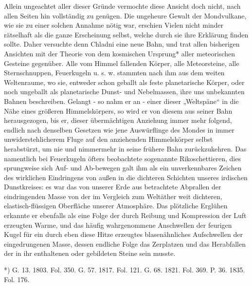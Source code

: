 \documentclass[a4paper, 8pt, oneside, polutonikogreek, german]{article}
\begin{document}
Allein ungeachtet aller dieser Gründe vermochte diese Ansicht doch nicht, nach allen Seiten hin vollständig zu genügen. Die ungeheure Gewalt der Mondvulkane, wie sie zu einer solchen Annahme nötig war, erschien Vielen nicht minder rätselhaft als die ganze Erscheinung selbst, welche durch sie ihre Erklärung finden sollte. Daher versuchte denn Chladni eine neue Bahn, und trat allen bisherigen Ansichten mit der Theorie von dem kosmischen Ursprung* aller meteorischen Gesteine gegenüber. Alle vom Himmel fallenden Körper, alle Meteorsteine, alle Sternschnuppen, Feuerkugeln u. s. w. stammten nach ihm aus dem weiten Weltenraume, wo sie, entweder schon geballt als feste planetarische Körper, oder noch ungeballt als planetarische Dunst- und Nebelmassen, ihre uns unbekannten Bahnen beschreiben. Gelangt - so nahm er an - einer dieser „Weltspäne“ in die Nähe eines größeren Himmelskörpers, so wird er von diesem aus seiner Bahn herausgezogen, bis er, dieser übermächtigen Anziehung immer mehr folgend, endlich nach denselben Gesetzen wie jene Auswürflinge des Mondes in immer unwiderstehlicherem Fluge auf den anziehenden Himmelskörper selbst herabstürzt, um nie und nimmermehr in seine frühere Bahn zurückzukehren. Das namentlich bei Feuerkugeln öfters beobachtete sogenannte Rikoschettieren, dies sprungweise sich Auf- und Ab-bewegen galt ihm als ein unverkennbares Zeichen des wirklichen Eindringens von außen in die dichteren Schichten unseres irdischen Dunstkreises: es war das von unserer Erde aus betrachtete Abprallen der eindringenden Masse von der im Vergleich zum Weltäther weit dichteren, elastisch-flüssigen Oberfläche unserer Atmosphäre. Das plötzliche Erglühen erkannte er ebenfalls als eine Folge der durch Reibung und Kompression der Luft erzeugten Warme, und das häufig wahrgenommene Anschwellen der feurigen Kugel für ein durch eben diese Hitze erzeugtes blasenähnliches Aufschwellen der eingedrungenen Masse, dessen endliche Folge das Zerplatzen und das Herabfallen der in ihr enthaltenen oder gebildeten Steine sein musste.

*) G. 13. 1803. Fol. 350. G. 57. 1817. Fol. 121. G. 68. 1821. Fol. 369. P. 36. 1835. Fol. 176.
\end{document}
